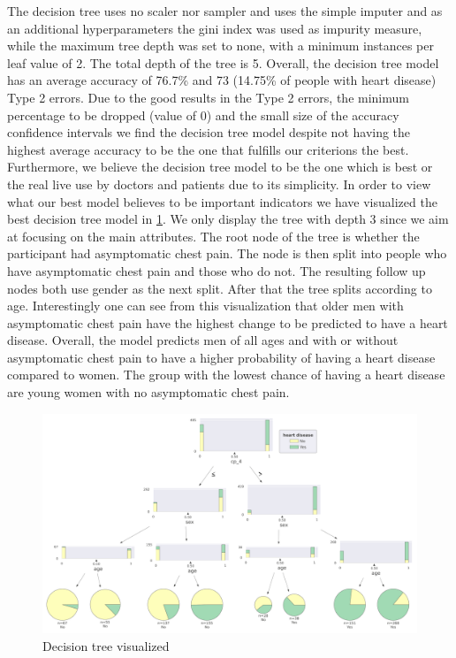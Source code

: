The decision tree uses no scaler nor sampler and uses the simple imputer and as an additional hyperparameters the gini index was used as impurity measure, while the maximum tree depth was set to none, with a minimum instances per leaf value of 2. The total depth of the tree is 5. Overall, the decision tree model has an average accuracy of 76.7\% and 73 (14.75\% of people with heart disease) Type 2 errors. Due to the good results in the Type 2 errors, the minimum percentage to be dropped (value of 0) and the small size of the accuracy confidence intervals we find the decision tree model despite not having the highest average accuracy to be the one that fulfills our criterions the best. Furthermore, we believe the decision tree model to be the one which is best or the real live use by doctors and patients due to its simplicity. 
In order to view what our best model believes to be important indicators we have visualized the best decision tree model in \cref{fig:DecisionTree}. We only display the tree with depth 3 since we aim at focusing on the main attributes. The root node of the tree is whether the participant had asymptomatic chest pain. The node is then split into people who have asymptomatic chest pain and those who do not. The resulting follow up nodes both use gender as the next split. After that the tree splits according to age. Interestingly one can see from this visualization that older men with asymptomatic chest pain have the highest change to be predicted to have a heart disease. Overall, the model predicts men of all ages and with or without asymptomatic chest pain to have a higher probability of having a heart disease compared to women. The group with the lowest chance of having a heart disease are young women with no asymptomatic chest pain. 

\begin{figure}[htbp]
	\centering
	\includegraphics[width=\textwidth]{images/DecisionTree.png}
	\caption{Decision tree visualized}
	\label{fig:DecisionTree}
\end{figure}


